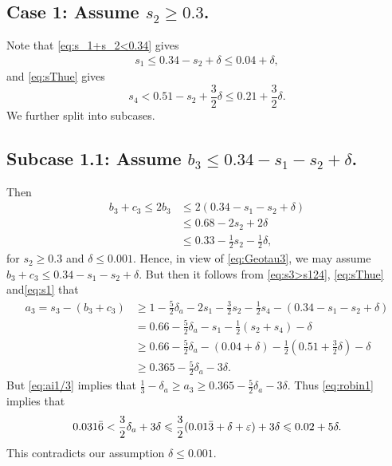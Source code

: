 \subsection*{Case 1: Assume $s_2\ge 0.3$.}

Note that \eqref{eq:s_1+s_2<0.34} gives
\begin{align}\label{eq:s1}
s_1 \leq  0.34-s_2+\delta \le 0.04+\delta,
\end{align}
and \eqref{eq:sThue} gives $$
s_4 < 0.51-s_2 +\frac{3}{2}\delta\le 0.21 +\frac{3}{2}\delta.
$$
We further split into subcases.

\subsection*{Subcase 1.1: Assume $b_3\le 0.34-s_1-s_2+\delta$.}

Then
\begin{align*}
b_3+c_3\le 2b_3
&\le 2(0.34-s_1-s_2+\delta)\\
&\le 0.68-2s_2 +2\delta \\
&\leq 0.33 -\frac{1}{2}s_2-\frac{1}{2}\delta,
\end{align*}
for $s_2\ge0.3$ and $\delta\leq 0.001$.
Hence, in view of  \eqref{eq:Geotau3}, we may assume $b_3+c_3\le 0.34-s_1-s_2+\delta$.
But then it follows from \eqref{eq:s3>s124}, \eqref{eq:sThue} and\eqref{eq:s1} that
\begin{align*}
a_3 = s_3 - (b_3 + c_3)
& \ge 1 -
\frac{5}{2}\delta_a-
2s_1 - \frac{3}{2}s_2 - \frac{1}{2}s_4 - (0.34-s_1-s_2+\delta)\\
& = 0.66
-\frac{5}{2}\delta_a
- s_1 - \frac{1}{2}(s_2 + s_4)-\delta\\
& \geq 0.66
-\frac{5}{2}\delta_a
- (0.04+\delta) - \frac{1}{2}(0.51+\frac{3}{2}\delta)-\delta\\
&\ge 0.365
-\frac{5}{2}\delta_a -3\delta.
\end{align*}
But \eqref{eq:ai1/3} implies that $\frac{1}{3}-\delta_a \ge a_3\geq 0.365
-\frac{5}{2}\delta_a -3\delta$. Thus \eqref{eq:robin1} implies that
$$
0.031\bar 6<\frac{3}{2}\delta_a +3\delta
\leqslant \frac{3}{2}(0.01\bar{3}+\delta+\varepsilon) +3\delta \leqslant 0.02+5\delta.
$$
This contradicts our assumption $\delta\leq 0.001$.


